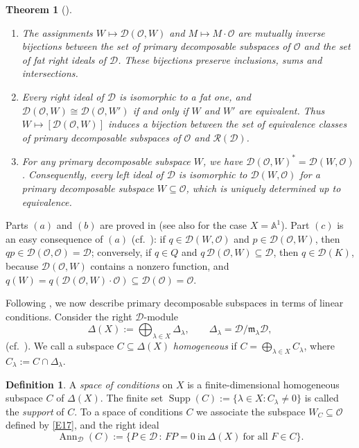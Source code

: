 \documentclass[11pt,reqno]{amsart}
\theoremstyle{plain}
\newtheorem{theorem}{Theorem}[section]
\theoremstyle{definition}
\newtheorem{definition}{Definition}
\theoremstyle{remark}
\numberwithin{equation}{section}
\newcommand{\cD}{\mathcal{D}}
\newcommand{\cO}{\mathcal{O}}
\newcommand{\cR}{\mathcal{R}}
\newcommand{\A}{\mathbb{A}}
\newcommand{\ml}{\mathfrak{m}_\lambda}
\newcommand{\Dl}{\Delta_\lambda}
\DeclareMathOperator{\Ann}{Ann}
\DeclareMathOperator{\Supp}{Supp}
\begin{document}
\begin{theorem}[\cite{CanningsHolland1994}]
\label{T2.1}
\begin{enumerate}
\item[$(a)$] The assignments $W \mapsto \cD(\cO, W)$ and $M \mapsto M \cdot \cO$ are mutually inverse
bijections between the set of primary decomposable subspaces of $\cO$ and the set of fat right
ideals of $\cD$. These bijections preserve inclusions, sums and intersections.
\item[$(b)$] Every right ideal of $\cD$ is isomorphic to a fat one, and
$\cD(\cO, W) \cong \cD(\cO, W')$ if and only if $W$ and $W'$ are equivalent. Thus
$W \mapsto [\cD(\cO, W)]$ induces a bijection between the set of equivalence classes of primary
decomposable subspaces of $\cO$ and $\cR(\cD)$.
\item[$(c)$] For any primary decomposable subspace $W$, we have $\cD(\cO, W)^* = \cD(W, \cO)$.
Consequently, every left ideal of $\cD$ is isomorphic to $\cD(W, \cO)$ for a primary decomposable
subspace $W \subseteq \cO$, which is uniquely determined up to equivalence.
\end{enumerate}
\end{theorem}

Parts $(a)$ and $(b)$ are proved in \cite{CanningsHolland1994} (see also
\cite[Section~3]{BerestWilson00} for the case $X = \A^1$). Part $(c)$ is an easy consequence of $(a)$ (cf.\
\cite[Lemma~5.3]{BerestWilson00}): if $q \in \cD(W, \cO)$ and $p \in \cD(\cO, W)$, then
$q p \in \cD(\cO, \cO) = \cD$; conversely, if $q \in Q$ and $q\, \cD(\cO, W) \subseteq \cD$, then
$q \in \cD(K)$, because $\cD(\cO, W)$ contains a nonzero function, and
$q(W) = q(\cD(\cO, W) \cdot \cO) \subseteq \cD(\cO) = \cO$.

Following \cite{Wilson1993}, we now describe primary decomposable subspaces in terms of linear
conditions. Consider the right $\cD$-module
\[
  \Delta(X) := \bigoplus_{\lambda \in X} \Dl , \qquad \Dl = \cD/\ml \cD ,
\]
(cf.\ \cite[Section~3]{BK98}). We call a subspace $C \subseteq \Delta(X)$ \emph{homogeneous} if
$C = \bigoplus_{\lambda \in X} C_\lambda$, where $C_\lambda := C \cap \Dl$.

\begin{definition}
\label{D2}
A \emph{space of conditions} on $X$ is a finite-dimensional homogeneous subspace $C$ of
$\Delta(X)$. The finite set $\Supp(C) := \{\lambda \in X : C_\lambda \ne 0\}$ is called the
\emph{support} of $C$. To a space of conditions $C$ we associate the subspace $W_C \subseteq \cO$
defined by \eqref{E17}, and the right ideal
\begin{equation}
\label{E27}
  \Ann_{\cD}(C) := \{ P \in \cD \, : \, F P = 0 \ \text{in}\ \Delta(X) \ \text{for all } F \in C \}.
\end{equation}
\end{definition}
\end{document}
